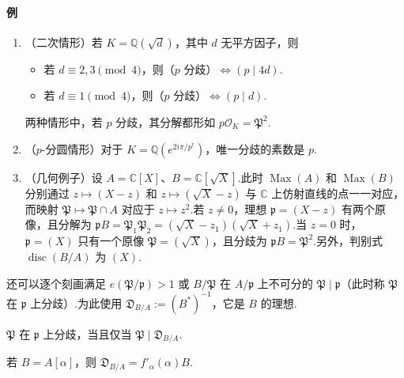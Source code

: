 \paragraph{例}
\begin{enumerate}[label=\roman*)]
\item （二次情形）若 $K=\mathbb Q(\sqrt d)$，其中 $d$ 无平方因子，则
\begin{itemize}
\item 若 $d\equiv2,3\pmod4$，则（$p$ 分歧）$\Leftrightarrow(p\mid4d)$.
\item 若 $d\equiv1\pmod4$，则（$p$ 分歧）$\Leftrightarrow(p\mid d)$.
\end{itemize}
两种情形中，若 $p$ 分歧，其分解都形如 $p\mathcal O_K=\mathfrak P^2$.
\item （$p$-分圆情形）对于 $K=\mathbb Q(e^{2i\pi/p^r})$，唯一分歧的素数是 $p$.
\item （几何例子）设 $A=\mathbb C[X]$、$B=\mathbb C[\sqrt X]$.此时 $\operatorname{Max}(A)$ 和 $\operatorname{Max}(B)$ 分别通过 $z\mapsto(X-z)$ 和 $z\mapsto(\sqrt X-z)$ 与 $\mathbb C$ 上仿射直线的点一一对应，而映射 $\mathfrak P\mapsto\mathfrak P\cap A$ 对应于 $z\mapsto z^2$.若 $z\ne0$，理想 $\mathfrak p=(X-z)$ 有两个原像，且分解为 $\mathfrak pB=\mathfrak P_1\mathfrak P_2=(\sqrt X-z_1)(\sqrt X+z_1)$.当 $z=0$ 时，$\mathfrak p=(X)$ 只有一个原像 $\mathfrak P=(\sqrt X)$，且分歧为 $\mathfrak pB=\mathfrak P^2$.另外，判别式 $\operatorname{disc}(B/A)$ 为 $(X)$.
\end{enumerate}
还可以逐个刻画满足 $e(\mathfrak P/\mathfrak p)>1$ 或 $B/\mathfrak P$ 在 $A/\mathfrak p$ 上不可分的 $\mathfrak P\mid\mathfrak p$（此时称 $\mathfrak P$ 在 $\mathfrak p$ 上分歧）.为此使用 $\mathfrak D_{B/A}:=(B^*)^{-1}$，它是 $B$ 的理想.
\begin{theorem*}
$\mathfrak P$ 在 $\mathfrak p$ 上分歧，当且仅当 $\mathfrak P\mid\mathfrak D_{B/A}$.
\end{theorem*}
\begin{exercise*}
若 $B=A[\alpha]$，则 $\mathfrak D_{B/A}=f'_\alpha(\alpha)B$.
\end{exercise*}


